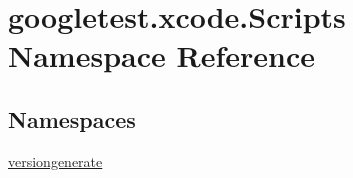 \hypertarget{namespacegoogletest_1_1xcode_1_1_scripts}{}\section{googletest.\+xcode.\+Scripts Namespace Reference}
\label{namespacegoogletest_1_1xcode_1_1_scripts}
\subsection*{Namespaces}
\begin{DoxyCompactItemize}
\item 
 \mbox{\hyperlink{namespacegoogletest_1_1xcode_1_1_scripts_1_1versiongenerate}{versiongenerate}}
\end{DoxyCompactItemize}
